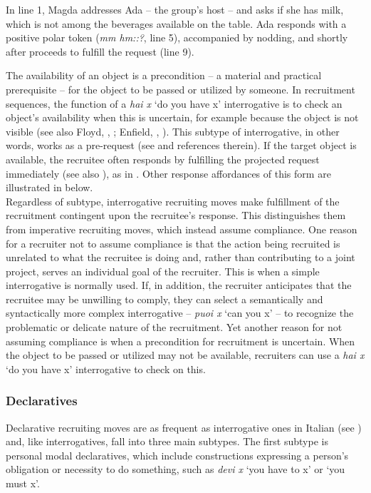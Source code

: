 \documentclass[output=paper,modfonts]{langscibook}
\begin{document}
In line 1, Magda addresses Ada -- the group's host -- and asks if she has milk, which is not among the beverages available on the table. Ada responds with a positive polar token (\textit{mm hm::?}, line 5), accompanied by nodding, and shortly after proceeds to fulfill the request (line 9).

The availability of an object is a precondition -- a material and practical prerequisite -- for the object to be passed or utilized by someone. In recruitment sequences, the function of a \textit{hai x} ‘do you have x’ interrogative is to check an object's availability when this is uncertain, for example because the object is not visible (see also Floyd, , ; Enfield, , ). This subtype of interrogative, in other words, works as a pre-request (see \citealt{Rossi2015b} and references therein). If the target object is available, the recruitee often responds by fulfilling the projected request immediately (see also \citealt{Fox2015}), as in . Other response affordances of this form are illustrated in  below.\\

\noindent %
Regardless of subtype, interrogative recruiting moves make fulfillment of the recruitment contingent upon the recruitee's response. This distinguishes them from imperative recruiting moves, which instead assume compliance. One reason for a recruiter not to assume compliance is that the action being recruited is unrelated to what the recruitee is doing and, rather than contributing to a joint project, serves an individual goal of the recruiter. This is when a simple interrogative is normally used. If, in addition, the recruiter anticipates that the recruitee may be unwilling to comply, they can select a semantically and syntactically more complex interrogative -- \textit{puoi x} ‘can you x’ -- to recognize the problematic or delicate nature of the recruitment. Yet another reason for not assuming compliance is when a precondition for recruitment is uncertain. When the object to be passed or utilized may not be available, recruiters can use a \textit{hai x} ‘do you have x’ interrogative to check on this.

\subsubsection{Declaratives}\label{sec:rossi:3.3.4}
Declarative recruiting moves are as frequent as interrogative ones in Italian (see ) and, like interrogatives, fall into three main subtypes. The first subtype is personal modal declaratives, which include constructions expressing a person's obligation or necessity to do something, such as \textit{devi x} ‘you have to x’ or ‘you must x’.
\end{document}
